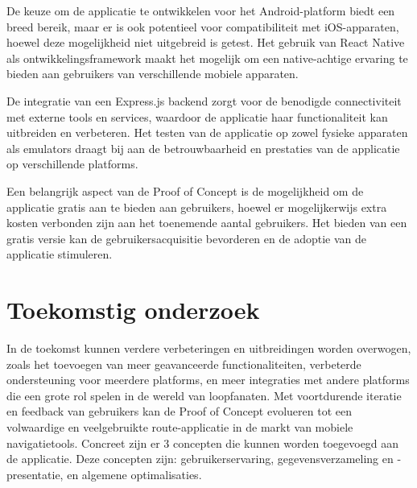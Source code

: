 \documentclass[a0,portrait]{hogent-poster}
\begin{document}
\begin{multicols}{2}


De keuze om de applicatie te ontwikkelen voor het Android-platform biedt een breed bereik, maar er is ook potentieel voor compatibiliteit met iOS-apparaten, hoewel deze mogelijkheid niet uitgebreid is getest. Het gebruik van React Native als ontwikkelingsframework maakt het mogelijk om een native-achtige ervaring te bieden aan gebruikers van verschillende mobiele apparaten.



De integratie van een Express.js backend zorgt voor de benodigde connectiviteit met externe tools en services, waardoor de applicatie haar functionaliteit kan uitbreiden en verbeteren. Het testen van de applicatie op zowel fysieke apparaten als emulators draagt bij aan de betrouwbaarheid en prestaties van de applicatie op verschillende platforms.



Een belangrijk aspect van de Proof of Concept is de mogelijkheid om de applicatie gratis aan te bieden aan gebruikers, hoewel er mogelijkerwijs extra kosten verbonden zijn aan het toenemende aantal gebruikers. Het bieden van een gratis versie kan de gebruikersacquisitie bevorderen en de adoptie van de applicatie stimuleren.

\section{Toekomstig onderzoek}

In de toekomst kunnen verdere verbeteringen en uitbreidingen worden overwogen, zoals het toevoegen van meer geavanceerde functionaliteiten, verbeterde ondersteuning voor meerdere platforms, en meer integraties met andere platforms die een grote rol spelen in de wereld van loopfanaten. Met voortdurende iteratie en feedback van gebruikers kan de Proof of Concept evolueren tot een volwaardige en veelgebruikte route-applicatie in de markt van mobiele navigatietools.
Concreet zijn er 3 concepten die kunnen worden toegevoegd aan de applicatie. Deze concepten zijn: gebruikerservaring, gegevensverzameling en -presentatie, en algemene optimalisaties. 
\end{multicols}
\end{document}
